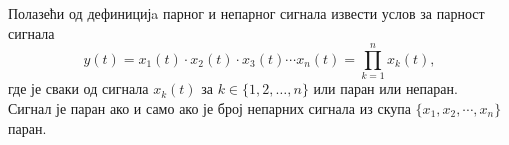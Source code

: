 \noindent
\PID 
Полазећи од дефиницијa парног и непарног сигнала
извести услов за парност сигнала
$$
	y(t) = x_1(t) \cdot x_2(t) \cdot x_3(t) \cdots x_n(t) = 
	\prod_{k = 1}^n x_k(t),
$$
где је сваки од сигнала $x_k(t)$ за $k \in \{1,2,\ldots,n\}$
или паран или непаран.
\\[2mm]

\REZULTAT  
Сигнал је паран ако и само ако је број непарних сигнала из скупа $\{
x_1, x_2, \cdots, x_n\}$ паран. \\[5mm]

